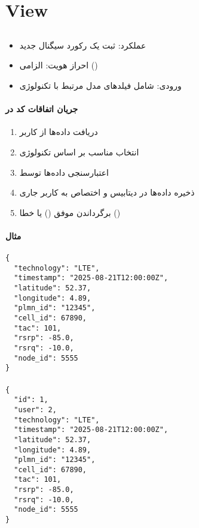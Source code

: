 \documentclass{report}
\begin{document}
\section{View}
\subsection{}
\subsubsection{}
\begin{itemize}
    \item عملکرد: ثبت یک رکورد سیگنال جدید
    \item احراز هویت: الزامی ()
    \item ورودی:  شامل فیلدهای مدل مرتبط با تکنولوژی
\end{itemize}

\paragraph{جریان اتفاقات کد در }
\begin{enumerate}
    \item دریافت داده‌ها از کاربر
    \item انتخاب  مناسب بر اساس تکنولوژی
    \item اعتبارسنجی داده‌ها توسط 
    \item ذخیره داده‌ها در دیتابیس و اختصاص  به کاربر جاری
    \item برگرداندن  موفق () یا خطا ()
\end{enumerate}

\paragraph{مثال }
\begin{latin}
\begin{lstlisting}[style=jsonstyle]
{
  "technology": "LTE",
  "timestamp": "2025-08-21T12:00:00Z",
  "latitude": 52.37,
  "longitude": 4.89,
  "plmn_id": "12345",
  "cell_id": 67890,
  "tac": 101,
  "rsrp": -85.0,
  "rsrq": -10.0,
  "node_id": 5555
}
\end{lstlisting}
\end{latin}

\paragraph{}
\begin{latin}
\begin{lstlisting}[style=jsonstyle]
{
  "id": 1,
  "user": 2,
  "technology": "LTE",
  "timestamp": "2025-08-21T12:00:00Z",
  "latitude": 52.37,
  "longitude": 4.89,
  "plmn_id": "12345",
  "cell_id": 67890,
  "tac": 101,
  "rsrp": -85.0,
  "rsrq": -10.0,
  "node_id": 5555
}
\end{lstlisting}
\end{latin}
\end{document}
